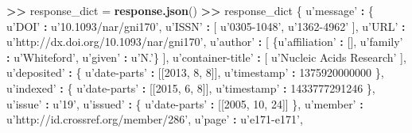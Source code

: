 \documentclass[]{krantz}
\newenvironment{Shaded}{\begin{snugshade}}{\end{snugshade}}
\newcommand{\KeywordTok}[1]{\textcolor[rgb]{0.13,0.29,0.53}{\textbf{#1}}}
\newcommand{\DecValTok}[1]{\textcolor[rgb]{0.00,0.00,0.81}{#1}}
\newcommand{\StringTok}[1]{\textcolor[rgb]{0.31,0.60,0.02}{#1}}
\newcommand{\OperatorTok}[1]{\textcolor[rgb]{0.81,0.36,0.00}{\textbf{#1}}}
\newcommand{\ErrorTok}[1]{\textcolor[rgb]{0.64,0.00,0.00}{\textbf{#1}}}
\newcommand{\NormalTok}[1]{#1}
\begin{document}
\begin{Shaded}
\begin{Highlighting}[]
\OperatorTok{>}\ErrorTok{>}\StringTok{ }\NormalTok{response_dict =}\StringTok{ }\KeywordTok{response.json}\NormalTok{()}
\OperatorTok{>}\ErrorTok{>}\StringTok{ }\NormalTok{response_dict}
\NormalTok{\{ u}\StringTok{'message'} \OperatorTok{:}
\StringTok{  }\NormalTok{\{ u}\StringTok{'DOI'} \OperatorTok{:}\StringTok{ }\NormalTok{u}\StringTok{'10.1093/nar/gni170'}\NormalTok{,}
\NormalTok{    u}\StringTok{'ISSN'} \OperatorTok{:}\StringTok{ }\NormalTok{[ u}\StringTok{'0305-1048'}\NormalTok{, u}\StringTok{'1362-4962'}\NormalTok{ ],}
\NormalTok{    u}\StringTok{'URL'} \OperatorTok{:}\StringTok{ }\NormalTok{u}\StringTok{'http://dx.doi.org/10.1093/nar/gni170'}\NormalTok{,}
\NormalTok{    u}\StringTok{'author'} \OperatorTok{:}\StringTok{ }\NormalTok{[ \{u}\StringTok{'affiliation'} \OperatorTok{:}\StringTok{ }\NormalTok{[],}
\NormalTok{                   u}\StringTok{'family'} \OperatorTok{:}\StringTok{ }\NormalTok{u}\StringTok{'Whiteford'}\NormalTok{,}
\NormalTok{                   u}\StringTok{'given'} \OperatorTok{:}\StringTok{ }\NormalTok{u}\StringTok{'N.'}\NormalTok{\} ],}
\NormalTok{    u}\StringTok{'container-title'} \OperatorTok{:}\StringTok{ }\NormalTok{[ u}\StringTok{'Nucleic Acids Research'}\NormalTok{ ],}
\NormalTok{    u}\StringTok{'deposited'} \OperatorTok{:}\StringTok{ }\NormalTok{\{ u}\StringTok{'date-parts'} \OperatorTok{:}\StringTok{ }\NormalTok{[[}\DecValTok{2013}\NormalTok{, }\DecValTok{8}\NormalTok{, }\DecValTok{8}\NormalTok{]],}
\NormalTok{                     u}\StringTok{'timestamp'} \OperatorTok{:}\StringTok{ }\DecValTok{1375920000000}\NormalTok{ \},}
\NormalTok{    u}\StringTok{'indexed'} \OperatorTok{:}\StringTok{ }\NormalTok{\{ u}\StringTok{'date-parts'} \OperatorTok{:}\StringTok{ }\NormalTok{[[}\DecValTok{2015}\NormalTok{, }\DecValTok{6}\NormalTok{, }\DecValTok{8}\NormalTok{]],}
\NormalTok{                   u}\StringTok{'timestamp'} \OperatorTok{:}\StringTok{ }\DecValTok{1433777291246}\NormalTok{ \},}
\NormalTok{    u}\StringTok{'issue'} \OperatorTok{:}\StringTok{ }\NormalTok{u}\StringTok{'19'}\NormalTok{,}
\NormalTok{    u}\StringTok{'issued'} \OperatorTok{:}\StringTok{ }\NormalTok{\{ u}\StringTok{'date-parts'} \OperatorTok{:}\StringTok{ }\NormalTok{[[}\DecValTok{2005}\NormalTok{, }\DecValTok{10}\NormalTok{, }\DecValTok{24}\NormalTok{]] \},}
\NormalTok{    u}\StringTok{'member'} \OperatorTok{:}\StringTok{ }\NormalTok{u}\StringTok{'http://id.crossref.org/member/286'}\NormalTok{,}
\NormalTok{    u}\StringTok{'page'} \OperatorTok{:}\StringTok{ }\NormalTok{u}\StringTok{'e171-e171'}\NormalTok{,}

\end{Highlighting}
\end{Shaded}
\end{document}
